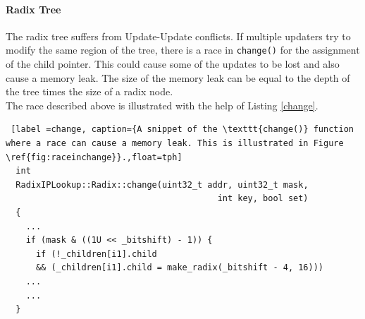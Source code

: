 \documentclass[a4paper,marginparwidth=50pt,marginparsep=10pt]{article}
\begin{document}
\paragraph{Radix Tree}
The radix tree suffers from Update-Update conflicts. If multiple updaters try to modify the same region of the tree, there is a race in \verb+change()+ for the assignment of the child pointer. This could cause some of the updates to be lost and also cause a memory leak. The size of the memory leak can be equal to the depth of the tree times the size of a radix node.\\

The race described above is illustrated with the help of Listing \ref{change}.
\begin{lstlisting} [label =change, caption={A snippet of the \texttt{change()} function where a race can cause a memory leak. This is illustrated in Figure \ref{fig:raceinchange}}.,float=tph]
  int
  RadixIPLookup::Radix::change(uint32_t addr, uint32_t mask,
                                          int key, bool set)
  {
    ...
    if (mask & ((1U << _bitshift) - 1)) {
      if (!_children[i1].child
      && (_children[i1].child = make_radix(_bitshift - 4, 16)))
    ...
    ...
  }
\end{lstlisting}
\end{document}

